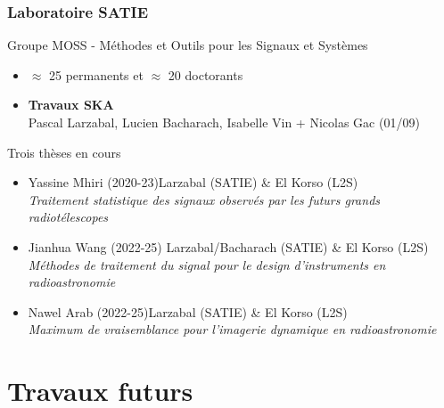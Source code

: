 \documentclass[usenames,dvipsnames]{beamer}
\begin{document}
\begin{frame}
  \frametitle{Laboratoire SATIE}
  \vfill %
  \vfill
  \begin{block}{Groupe MOSS - Méthodes et Outils pour les Signaux et Systèmes}
    \begin{itemize}
  \item  \(\approx \) 25 permanents et \(\approx\) 20 doctorants
  \item \textbf{Travaux SKA} \\
 \vspace{0.1cm}
  Pascal Larzabal, Lucien Bacharach, Isabelle Vin + Nicolas Gac \scriptsize{(01/09)}
\end{itemize}
  \end{block}
  \vfill

  \begin{block}{Trois thèses en cours}
    \begin{itemize}
     \item \normalsize{Yassine Mhiri (2020-23)}\hfill \scriptsize{Larzabal (SATIE) \& El Korso (L2S)} \\
    \small{\textit{Traitement statistique des signaux observés par les futurs grands radiotélescopes}}\\
    \item \normalsize{Jianhua Wang (2022-25)} \hfill \scriptsize{Larzabal/Bacharach (SATIE) \& El Korso (L2S) } \\
    \small{\textit{Méthodes de traitement du signal pour le design d'instruments en radioastronomie}}\\
    \item \normalsize{Nawel Arab (2022-25)}\hfill \scriptsize{Larzabal (SATIE) \& El Korso (L2S)} \\
    \small{\textit{Maximum de vraisemblance pour l’imagerie dynamique en radioastronomie}}\\
    \end{itemize}
  \end{block}
  
\end{frame}



\section{Travaux futurs}
\end{document}
